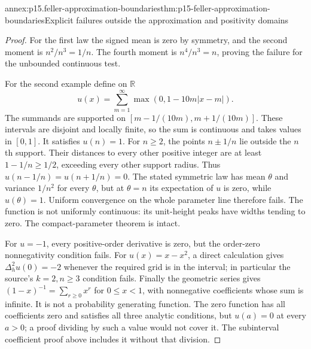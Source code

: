 \begin{annexitem}{annex:p15.feller-approximation-boundaries}{thm:p15-feller-approximation-boundaries}{Explicit failures outside the approximation and positivity domains}
\begin{proof}
For the first law the signed mean is zero by symmetry, and
the second moment is \(n^2/n^3=1/n\).
The fourth moment is \(n^4/n^3=n\), proving the failure for the
unbounded continuous test.

For the second example define on \(\mathbb R\)
\[
                       u(x)=\sum_{m=1}^\infty
                                      \max(0,1-10m|x-m|).
\]
The summands are supported on
\([m-1/(10m),m+1/(10m)]\).
These intervals are disjoint and locally finite, so the sum is
continuous and takes values in \([0,1]\).
It satisfies \(u(n)=1\).
For \(n\geq2\), the points \(n\pm1/n\) lie outside the \(n\)th
support. Their distances to every other positive integer are at
least \(1-1/n\geq1/2\), exceeding every other support radius.
Thus \(u(n-1/n)=u(n+1/n)=0\).
The stated symmetric law has mean \(\theta\) and variance \(1/n^2\)
for every \(\theta\), but at \(\theta=n\) its expectation of \(u\)
is zero, while \(u(\theta)=1\).
Uniform convergence on the whole parameter line therefore fails.
The function is not uniformly continuous: its unit-height peaks
have widths tending to zero. The compact-parameter theorem is intact.

For \(u=-1\), every positive-order derivative is zero, but
the order-zero nonnegativity condition fails.
For \(u(x)=x-x^2\), a direct calculation gives
\(\Delta_h^2u(0)=-2\) whenever the required grid is in the interval;
in particular the source's \(k=2,n\geq3\) condition fails.
Finally the geometric series gives \((1-x)^{-1}=\sum_{r\geq0}x^r\)
for \(0\leq x<1\), with nonnegative coefficients whose sum is infinite.
It is not a probability generating function.
The zero function has all coefficients zero and satisfies all three
analytic conditions, but \(u(a)=0\) at every \(a>0\); a proof dividing
by such a value would not cover it. The subinterval coefficient proof
above includes it without that division.
\end{proof}
\end{annexitem}
